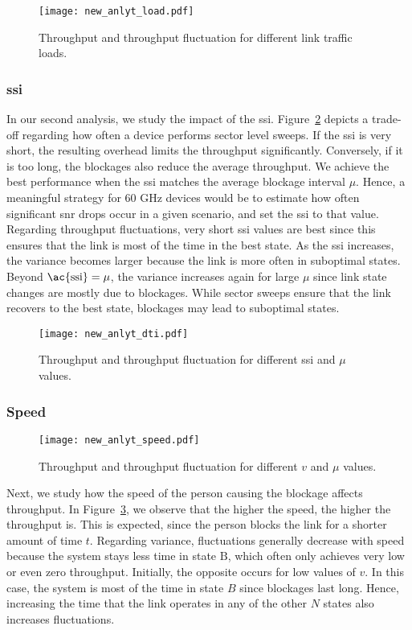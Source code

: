 \documentclass{article}
\begin{document}
\begin{figure}
	\centering
		\texttt{[image: new\_anlyt\_load.pdf]}
	\caption{Throughput and throughput fluctuation for different link traffic loads.}
	\label{fig:anlyt_load}
\end{figure}


\subsubsection{\acl{ssi}}

In our second analysis, we study the impact of the \ac{ssi}. Figure~\ref{fig:anlyt_dti} depicts a trade-off regarding how often a device performs sector level sweeps. If the \ac{ssi} is very short, the resulting overhead limits the throughput significantly. Conversely, if it is too long, the blockages also reduce the average throughput. We achieve the best performance when the \ac{ssi} matches the average blockage interval $\mu$. Hence, a meaningful strategy for 60 GHz devices would be to estimate how often significant \ac{snr} drops occur in a given scenario, and set the \ac{ssi} to that value. Regarding throughput fluctuations, very short \ac{ssi} values are best since this ensures that the link is most of the time in the best state. As the \ac{ssi} increases, the variance becomes larger because the link is more often in suboptimal states. Beyond $\text{\ac{ssi}} = \mu$, the variance increases again for large $\mu$ since link state changes are mostly due to blockages. While sector sweeps ensure that the link recovers to the best state, blockages may lead to suboptimal states. 

\begin{figure}[t]
	\centering
		\texttt{[image: new\_anlyt\_dti.pdf]}
	\caption{Throughput and throughput fluctuation for different \ac{ssi} and $\mu$ values.}
	\label{fig:anlyt_dti}
\end{figure}

\subsubsection{Speed}

\begin{figure}[t]
	\centering
		\texttt{[image: new\_anlyt\_speed.pdf]}
	\caption{Throughput and throughput fluctuation for different $v$ and $\mu$ values.}
	\label{fig:anlyt_speed}
\end{figure}

Next, we study how the speed of the person causing the blockage affects throughput. In Figure~\ref{fig:anlyt_speed}, we observe that the higher the speed, the higher the throughput is. This is expected, since the person blocks the link for a shorter amount of time $t$. Regarding variance, fluctuations generally decrease with speed because the system stays less time in state $\text{B}$, which often only achieves very low or even zero throughput. Initially, the opposite occurs for low values of $v$. In this case, the system is most of the time in state $B$ since blockages last long. Hence, increasing the time that the link operates in any of the other $N$ states also increases fluctuations.
\end{document}
